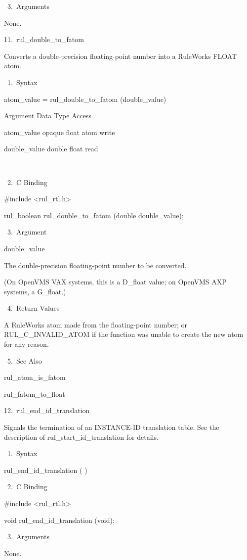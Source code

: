        3. Arguments

    None.

11. rul_double_to_fatom

    Converts a double-precision floating-point
    number into a RuleWorks FLOAT atom.

       1. Syntax

          atom_value = rul_double_to_fatom
          (double_value)

          Argument   Data Type    Access

          atom_value   opaque float atom
            write

          double_value   double float    read

           

       2. C Binding

          #include <rul_rtl.h>

          rul_boolean rul_double_to_fatom
          (double double_value);

       3. Argument

          double_value

          The double-precision floating-point
          number to be converted.

          (On OpenVMS VAX systems, this is a
          D_float value; on OpenVMS AXP
          systems, a G_float.)

       4. Return Values

          A RuleWorks atom made from the
          floating-point number; or
          RUL_C_INVALID_ATOM if the function
          was unable to create the new atom
          for any reason.

       5. See Also

    rul_atom_is_fatom

    rul_fatom_to_float

12. rul_end_id_translation

    Signals the termination of an INSTANCE-ID
    translation table. See the description of
    rul_start_id_translation for details.

       1. Syntax

          rul_end_id_translation ( )

       2. C Binding

          #include <rul_rtl.h>

          void rul_end_id_translation (void);

       3. Arguments

          None.

